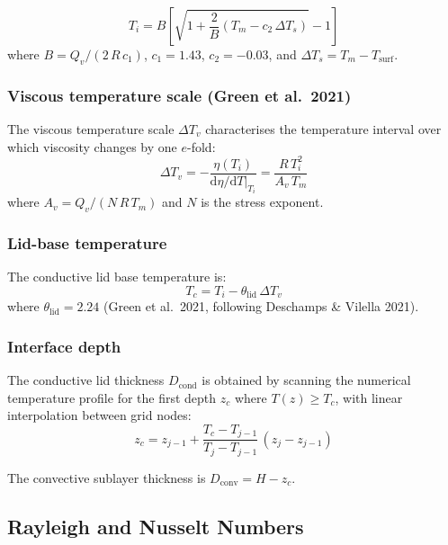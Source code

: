 \documentclass[11pt,a4paper]{article}
\newcommand{\dd}{\mathrm{d}}
\begin{document}
\begin{equation}
T_i = B\left[\sqrt{1 + \frac{2}{B}(T_m - c_2\,\Delta T_s)} - 1\right]
\label{eq:Ti}
\end{equation}
where $B = Q_v / (2\,R\,c_1)$, $c_1 = 1.43$, $c_2 = -0.03$, and
$\Delta T_s = T_m - T_{\mathrm{surf}}$.

\subsubsection{Viscous temperature scale (Green et al.\ 2021)}

The viscous temperature scale $\Delta T_v$ characterises the temperature
interval over which viscosity changes by one $e$-fold:
\begin{equation}
\Delta T_v = -\frac{\eta(T_i)}{\dd\eta/\dd T\big|_{T_i}}
  = \frac{R\,T_i^2}{A_v\,T_m}
\label{eq:DTv}
\end{equation}
where $A_v = Q_v / (N\,R\,T_m)$ and $N$ is the stress exponent.

\subsubsection{Lid-base temperature}

The conductive lid base temperature is:
\begin{equation}
T_c = T_i - \theta_{\mathrm{lid}}\,\Delta T_v
\label{eq:Tc}
\end{equation}
where $\theta_{\mathrm{lid}} = 2.24$ (Green et al.\ 2021, following
Deschamps \& Vilella 2021).

\subsubsection{Interface depth}

The conductive lid thickness $D_{\mathrm{cond}}$ is obtained by scanning
the numerical temperature profile for the first depth $z_c$ where
$T(z) \geq T_c$, with linear interpolation between grid nodes:
\begin{equation}
z_c = z_{j-1} + \frac{T_c - T_{j-1}}{T_j - T_{j-1}}\,(z_j - z_{j-1})
\label{eq:zc}
\end{equation}

The convective sublayer thickness is $D_{\mathrm{conv}} = H - z_c$.

\subsection{Rayleigh and Nusselt Numbers}
\end{document}
